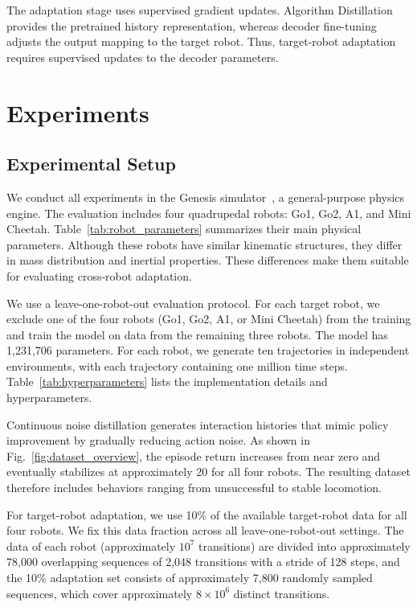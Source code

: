\documentclass[runningheads]{llncs}
\begin{document}
The adaptation stage uses supervised gradient updates.
Algorithm Distillation provides the pretrained history representation, whereas decoder fine-tuning adjusts the output mapping to the target robot.
Thus, target-robot adaptation requires supervised updates to the decoder parameters.

\section{Experiments}
\label{experiment}

\subsection{Experimental Setup}

We conduct all experiments in the Genesis simulator~\cite{Genesis}, a general-purpose physics engine.
The evaluation includes four quadrupedal robots: Go1, Go2, A1, and Mini Cheetah. 
Table~\ref{tab:robot_parameters} summarizes
their main physical parameters. 
Although these robots have similar kinematic structures, they differ in mass distribution and inertial properties.
These differences make them suitable for evaluating cross-robot adaptation.

We use a leave-one-robot-out evaluation protocol.
For each target robot, we exclude one of the four robots (Go1, Go2, A1, or Mini Cheetah) from the training and train the model on data from the remaining three robots.
The model has 1,231,706 parameters.
For each robot, we generate ten trajectories in independent environments, with each trajectory containing one million time steps.
Table~\ref{tab:hyperparameters} lists the implementation details and hyperparameters.

Continuous noise distillation generates interaction histories that mimic policy improvement by gradually reducing action noise.
As shown in Fig.~\ref{fig:dataset_overview}, the episode return increases from near zero and eventually stabilizes at approximately 20 for all four robots.
The resulting dataset therefore includes behaviors ranging from unsuccessful to stable locomotion.


For target-robot adaptation, we use 10\% of the available target-robot data for all four robots. We fix this data fraction across all leave-one-robot-out settings.
The data of each robot (approximately $10^7$ transitions) are divided into approximately 78,000 overlapping sequences of 2,048 transitions with a stride of 128 steps, and the 10\% adaptation set consists of approximately 7,800 randomly sampled sequences, which cover approximately $8\times10^6$ distinct transitions.
\end{document}
